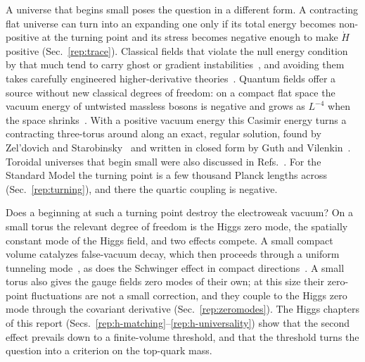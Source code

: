 A universe that begins small poses the question in a different form.
A contracting flat universe can turn into an expanding one only if its total energy becomes non-positive at the turning point and its stress becomes negative enough to make $\dot H$ positive (Sec.~\ref{rep:trace}).
Classical fields that violate the null energy condition by that much tend to carry ghost or gradient instabilities~\cite{Dubovsky:2005xd,Kobayashi:2016xpl}, and avoiding them takes carefully engineered higher-derivative theories~\cite{Ijjas:2016tpn}.
Quantum fields offer a source without new classical degrees of freedom: on a compact flat space the vacuum energy of untwisted massless bosons is negative and grows as $L^{-4}$ when the space shrinks~\cite{DeWitt:1979dd}.
With a positive vacuum energy this Casimir energy turns a contracting three-torus around along an exact, regular solution, found by Zel'dovich and Starobinsky~\cite{Zeldovich:1984vk} and written in closed form by Guth and Vilenkin~\cite{Guth:2025dal}.
Toroidal universes that begin small were also discussed in Refs.~\cite{Coule:1999wg,Linde:2004nz,Fornal:2026qfq}.
For the Standard Model the turning point is a few thousand Planck lengths across (Sec.~\ref{rep:turning}), and there the quartic coupling is negative.

Does a beginning at such a turning point destroy the electroweak vacuum?
On a small torus the relevant degree of freedom is the Higgs zero mode, the spatially constant mode of the Higgs field, and two effects compete.
A small compact volume catalyzes false-vacuum decay, which then proceeds through a uniform tunneling mode~\cite{Hassan:2026cmp}, as does the Schwinger effect in compact directions~\cite{Brown:2015kgj}.
A small torus also gives the gauge fields zero modes of their own; at this size their zero-point fluctuations are not a small correction, and they couple to the Higgs zero mode through the covariant derivative (Sec.~\ref{rep:zeromodes}).
The Higgs chapters of this report (Secs.~\ref{rep:h-matching}--\ref{rep:h-universality}) show that the second effect prevails down to a finite-volume threshold, and that the threshold turns the question into a criterion on the top-quark mass.

